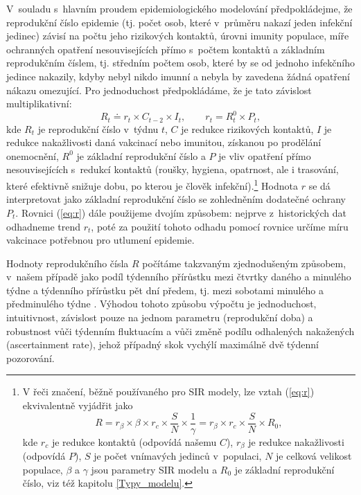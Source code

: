 V~souladu s~hlavním proudem epidemiologického modelování předpokládejme, že reprodukční číslo epidemie (tj. 
počet osob, které v~průměru nakazí jeden infekční jedinec) závisí na počtu jeho
rizikových kontaktů, úrovni imunity populace, míře ochranných opatření
nesouvisejících přímo s~počtem kontaktů a základním reprodukčním
číslem, tj. středním počtem osob, které by se od jednoho infekčního jedince nakazily, kdyby nebyl
nikdo imunní a nebyla by zavedena žádná opatření nákazu omezující. Pro jednoduchost
předpokládáme, že je tato závislost multiplikativní: 
\begin{equation}
R_{t}\doteq r_{t}\times C_{t-2}\times I_{t},\qquad r_{t}=R_{t}^{0}\times P_{t},
\label{eq:r}
\end{equation}
kde $R_{t}$ je reprodukční číslo v~týdnu $t$, $C$ je redukce rizikových kontaktů,
$I$ je redukce nakažlivosti daná vakcinací nebo imunitou, získanou
po prodělání onemocnění, $R^{0}$ je základní reprodukční číslo a
$P$ je vliv opatření přímo nesouvisejících s~redukcí kontaktů (roušky, hygiena, opatrnost, ale i trasování, které efektivně snižuje dobu, po kterou je člověk infekční).\footnote{V řeči značení, běžně používaného pro SIR modely, lze vztah (\ref{eq:r}) ekvivalentně vyjádřit jako 
$$ 
R = r_\beta \times \beta \times r_c \times \frac{S}{N} \times \frac{1}\gamma = r_\beta \times r_c \times \frac{S}{N} \times R_0,
$$
kde $r_c$ je redukce kontaktů (odpovídá našemu $C$), $r_\beta$ je redukce nakažlivosti (odpovídá $P$), $S$ je počet vnímavých jedinců v~populaci, $N$ je celková velikost populace, $\beta$ a $\gamma$ jsou parametry SIR modelu a $R_0$ je základní reprodukční číslo, viz též kapitolu \ref{Typy_modelu}.} Hodnota $r$ se dá interpretovat jako základní reprodukční
číslo se zohledněním dodatečné ochrany $P_{t}$. Rovnici (\ref{eq:r}) dále použijeme dvojím způsobem: nejprve z~historických dat odhadneme trend $r_t$, poté za použití tohoto odhadu pomocí rovnice určíme míru vakcinace potřebnou pro utlumení epidemie.

Hodnoty reprodukčního čísla $R$ počítáme takzvaným zjednodušeným způsobem, v~našem případě jako podíl týdenního přírůstku mezi čtvrtky daného a minulého týdne a týdenního přírůstku pět dní předem,
tj. mezi sobotami minulého a předminulého týdne \cite{Rodhad}. Výhodou tohoto způsobu výpočtu je jednoduchost, intuitivnost, závislost pouze na jednom parametru (reprodukční doba) a robustnost vůči týdenním fluktuacím a vůči změně podílu
odhalených nakažených (ascertainment rate), jehož případný skok vychýlí
maximálně dvě týdenní pozorování.

